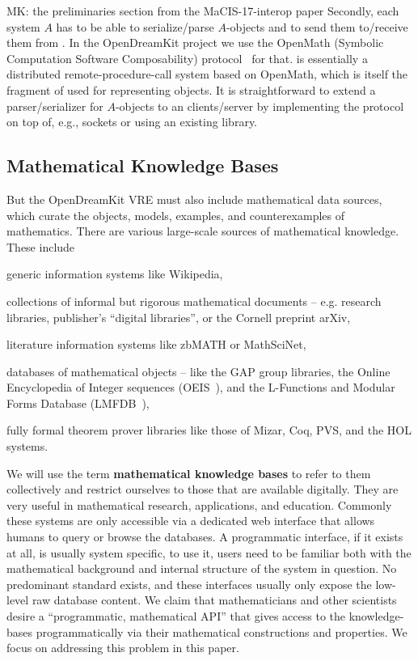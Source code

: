 \begin{newpart}{MK: the preliminaries section from the MaCIS-17-interop paper}
Secondly, each system $A$ has to be able to serialize/parse $A$-objects and to send them to/receive them from \MMT.
In the OpenDreamKit project we use the OpenMath \SCSCP (Symbolic Computation Software Composability) protocol~\cite{SCSCP-1.3} for that. 
\SCSCP is essentially a distributed remote-procedure-call system based on OpenMath, which is itself the fragment of \OMMT used for representing objects.
It is straightforward to extend a parser/serializer for $A$-objects to an \SCSCP clients/server by implementing the \SCSCP protocol on top of, e.g., sockets or using an existing \SCSCP library. 


\subsection{Mathematical Knowledge Bases}\label{sec:mkb}

But the \textsf{OpenDreamKit} VRE must also include mathematical data sources, which
curate the objects, models, examples, and counterexamples of mathematics.  There are
various large-scale sources of mathematical knowledge.  These include
\begin{compactitem}
\item generic information systems like Wikipedia,
\item collections of informal but rigorous mathematical documents -- e.g. research libraries, publisher's ``digital libraries'', or the Cornell preprint arXiv,
\item literature information systems like zbMATH or MathSciNet,
\item databases of mathematical objects -- like the GAP group libraries, the Online Encyclopedia of Integer sequences (OEIS~\cite{Sloane:OEIS,oeis}), and the L-Functions and Modular Forms Database (LMFDB~\cite{Cremona:LMFDB16,lmfdb:on}),
\item fully formal theorem prover libraries like those of Mizar, Coq, PVS, and the HOL systems.
\end{compactitem}
  
We will use the term \textbf{mathematical knowledge bases} to refer to them collectively and restrict ourselves to those that are available digitally.
They are very useful in mathematical research, applications, and education.  
Commonly these systems are only accessible via a dedicated web interface that allows humans to query or browse the databases. 
A programmatic interface, if it exists at all, is usually system specific, to use it, users need to be familiar both with the mathematical background and internal structure of the system in question.  
No predominant standard exists, and these interfaces usually only expose the low-level raw database content.
We claim that mathematicians and other scientists desire a ``programmatic, mathematical API'' that gives access to the knowledge-bases programmatically via their mathematical constructions and properties. 
We focus on addressing this problem in this paper.


\end{newpart}
